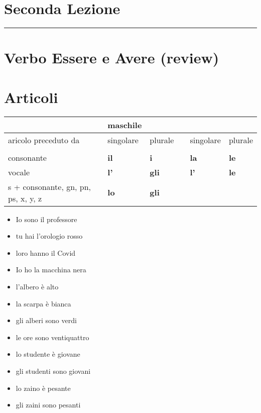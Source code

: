 \documentclass[letter,11pt]{article}
\begin{document}
\section*{\Large{Seconda Lezione}}
\noindent\rule{16cm}{1pt}

\section*{Verbo Essere e Avere (review)}

\section*{Articoli}


\begin{tabular}{ |p{2cm}| p{0.2cm}| p{2cm}| p{2cm}| p{0.2cm}| p{2cm}| p{2cm}| }
     &  & {\bf maschile} & & & & \\
    \hline
     aricolo preceduto da &  & singolare & plurale & & singolare & plurale \\
    \hline
    \hline
     &  &  & & & & \\ \hline
    consonante &  & {\bf il} & {\bf i} & & {\bf la}  & {\bf le} \\ \hline
    vocale & & {\bf l'} & {\bf gli} & & {\bf l'}  & {\bf le} \\ \hline
    s + consonante, gn, pn, ps, x, y, z & & {\bf lo} & {\bf gli} &   \\
    \hline
    \hline
\end{tabular}

\vskip 0.5in
\begin{multicols}{2}
\begin{itemize}
    \item Io sono il professore
    \item tu hai l'orologio rosso
    \item loro hanno il Covid
    \item Io ho la macchina nera
    \item l'albero è alto
    \item la scarpa è bianca
    \item gli alberi sono verdi
    \item le ore sono ventiquattro
    \item lo studente è giovane
    \item gli studenti sono giovani
    \item lo zaino è pesante
    \item gli zaini sono pesanti

\end{itemize}
\end{multicols}
\end{document}
